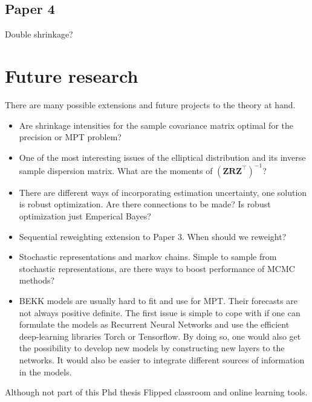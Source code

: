 \documentclass[]{book}
\begin{document}
\section*{Paper 4}
Double shrinkage?
\chapter{Future research}
There are many possible extensions and future projects to the theory at hand. 

\begin{itemize}
	\item Are shrinkage intensities for the sample covariance matrix optimal for the precision or MPT problem? 
	\item One of the most interesting issues of the elliptical distribution and its inverse sample dispersion matrix. What are the moments of $(\mathbf{Z} \mathbf{R} \mathbf{Z}^\top)^{-1}$? 
	\item There are different ways of incorporating estimation uncertainty, one solution is robust optimization. Are there connections to be made? Is robust optimization just Emperical Bayes?
	\item Sequential reweighting extension to Paper 3. When should we reweight?
	\item Stochastic representations and markov chains. Simple to sample from stochastic representations, are there ways to boost performance of MCMC methods?
	\item BEKK models are usually hard to fit and use for MPT. Their forecasts are not always positive definite. The first issue is simple to cope with if one can formulate the models as Recurrent Neural Networks and use the efficient deep-learning libraries Torch or Tensorflow. By doing so, one would also get the possibility to develop new models by constructing new layers to the networks. It would also be easier to integrate different sources of information in the models.
\end{itemize}

Although not part of this Phd thesis Flipped classroom and online learning tools.


\end{document}
